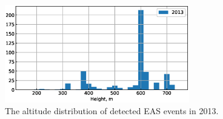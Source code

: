 \documentclass[final,5p,times,twocolumn]{elsarticle}
\begin{document}





\begin{figure}[t]
    \includegraphics[width=19pc]{figs/height_eas.eps}\hspace{2pc}%
    \caption{The altitude distribution of detected EAS events in 2013.}
    \label{fig:height_eas}
\end{figure}
\end{document}
